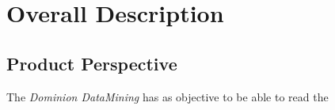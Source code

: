 \documentclass{scrreprt}
\begin{document}


\chapter{Overall Description}

\section{Product Perspective}
The \textit{Dominion DataMining} has as objective to be able to read the
\end{document}
